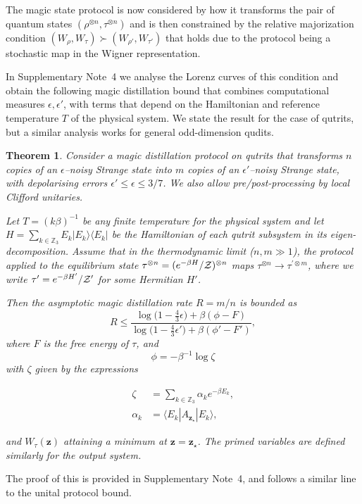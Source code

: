 \documentclass[
onecolumn,
superscriptaddress
]{revtex4-1}
\newtheorem{theorem}{Theorem}
\def\>{\rangle}
\def\<{\langle}
\def\z{\boldsymbol{z}}
\def\Z{{\cal Z}}
\begin{document}
The magic state protocol is now considered by how it transforms the pair of quantum states $(\rho^{\otimes n}, \tau^{\otimes n})$ and is then constrained by the relative majorization condition $(W_{\rho}, W_\tau) \succ (W_{\rho'}, W_{\tau'})$ that holds due to the protocol being a stochastic map in the Wigner representation.

In Supplementary Note~4 we analyse the Lorenz curves of this condition and obtain the following magic distillation bound that combines computational measures $\epsilon,\epsilon'$, with terms that depend on the Hamiltonian and reference temperature $T$ of the physical system. We state the result for the case of qutrits, but a similar analysis works for general odd-dimension qudits.

\begin{theorem}\label{thm:free-energy}
	Consider a magic distillation protocol on qutrits that transforms $n$ copies of an $\epsilon$--noisy Strange state into $m$ copies of an $\epsilon'$--noisy Strange state, with depolarising errors $\epsilon' \leq \epsilon \leq 3/7$. We also allow pre/post-processing by local Clifford unitaries.
	
	Let $T =(k\beta)^{-1}$ be any finite temperature for the physical system and let $H= \sum_{k \in \mathbb{Z}_3} E_k |E_k\>\<E_k|$ be the Hamiltonian of each qutrit subsystem in its eigen-decomposition.
Assume that in the thermodynamic limit ($n,m \gg 1$), the protocol applied to the equilibrium state $\tau^{\otimes n} = (e^{-\beta H}/\Z)^{\otimes n}$ maps $\tau^{\otimes n} \longrightarrow \tau^{\prime \otimes m}$, where we write $\tau' = e^{-\beta H'}/\Z'$ for some Hermitian $H'$.

Then the asymptotic magic distillation rate $R = m/n$ is bounded as
\begin{equation}\label{eq:rate_bounds_proof}
	R \leq \dfrac{\log \big( 1-\frac{4}{3}\epsilon \big) + \beta (\phi - F)}{\log \big( 1-\frac{4}{3}\epsilon' \big) + \beta (\phi' - F')},
\end{equation}
where $F$ is the free energy of $\tau$,  and 
\begin{equation}\label{eq:phi}
	\phi = -\beta^{-1} \log \zeta
\end{equation}
with $\zeta$ given by the expressions
\begin{linenomath}\begin{align}
	\zeta &= \sum_{k\in \mathbb{Z}_3} \alpha_k e^{-\beta E_k}, \\
	\alpha_k &= \<E_k| A_{\z_\star} |E_k\>,
\end{align}\end{linenomath}
and $W_\tau(\z)$ attaining a minimum at $\z=\z_\star$. The primed variables are defined similarly for the output system.
\end{theorem}
\noindent The proof of this is provided in Supplementary Note~4, and follows a similar line to the unital protocol bound.
\end{document}
